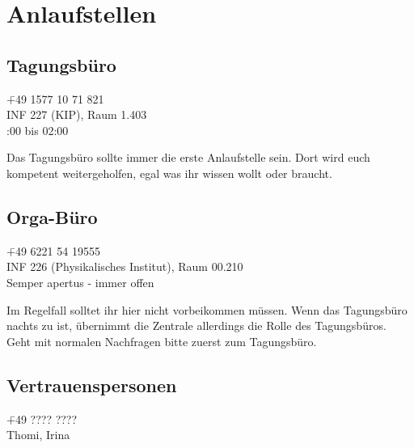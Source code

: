 
\section{Anlaufstellen}

\subsection{Tagungsbüro}
\begin{tabbing}
\faPhone \quad \quad \quad \= +49 1577 10 71 821\\ %
\faMapPin \> INF 227 (KIP), Raum 1.403 \\ %
\faClockO {}:00 bis 02:00 %
\end{tabbing}

\noindent Das Tagungsbüro sollte immer die erste Anlaufstelle sein. Dort wird euch kompetent weitergeholfen, egal was ihr wissen wollt oder braucht.

\subsection{Orga-Büro}
\begin{tabbing}
\faPhone \quad \quad \quad \= +49 6221 54 19555\\
\faMapPin \> INF 226 (Physikalisches Institut), Raum 00.210\\
\faClockO \> Semper apertus - immer offen
\end{tabbing}

\noindent Im Regelfall solltet ihr hier nicht vorbeikommen müssen. Wenn das Tagungsbüro nachts zu ist, übernimmt die Zentrale allerdings die Rolle des Tagungsbüros. Geht mit normalen Nachfragen bitte zuerst zum Tagungsbüro. %

\subsection{Vertrauenspersonen}
\begin{tabbing}
\faPhone \quad \quad \quad \= +49 ???? ????\\ %
\faUsers \> Thomi, Irina \\ %
\end{tabbing}

